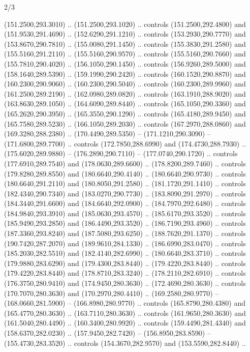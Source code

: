 \begin{flagdescription}{2/3}
\begin{scope}[xshift=0.5\flaglength,yshift=0.5\flagwidth,scale=\stretchfactor]
\begin{scope}[scale=0.001645\flagwidth,yshift=65mm,xshift=-63mm]
\begin{scope}[y=0.80pt, x=0.80pt, yscale=-1,]
\begin{scope}[cm={{1.33333,0.0,0.0,1.33333,(0.0,1e-05)}}]
  (151.2500,293.3010) .. (151.2500,293.1020) .. controls (151.2500,292.4800) and
  (151.9530,291.4690) .. (152.6290,291.1210) .. controls (153.2930,290.7770) and
  (153.8670,290.7810) .. (155.0080,291.1450) .. controls (155.3830,291.2580) and
  (155.5160,291.2110) .. (155.5160,290.9570) .. controls (155.5160,290.7660) and
  (155.7810,290.4020) .. (156.1050,290.1450) .. controls (156.9260,289.5000) and
  (158.1640,289.5390) .. (159.1990,290.2420) .. controls (160.1520,290.8870) and
  (160.2300,290.9060) .. (160.2300,290.5040) .. controls (160.2300,289.9960) and
  (161.2500,289.2190) .. (162.0980,289.0820) .. controls (163.1910,288.9020) and
  (163.8630,289.1050) .. (164.6090,289.8440) .. controls (165.1050,290.3360) and
  (165.2620,290.3950) .. (165.3550,290.1290) .. controls (165.4180,289.9450) and
  (165.7580,289.5230) .. (166.1050,289.2030) .. controls (167.2970,288.0860) and
  (169.3280,288.2380) .. (170.4490,289.5350) -- (171.1210,290.3090) --
  (171.6800,289.7700) .. controls (172.7850,288.6990) and (174.4730,288.7930) ..
  (175.6020,289.9880) -- (176.2890,290.7110) -- (177.0740,290.1720) .. controls
  (177.6910,289.7540) and (178.0630,289.6600) .. (178.8200,289.7460) .. controls
  (179.8280,289.8550) and (180.6640,290.4140) .. (180.6640,290.9730) .. controls
  (180.6640,291.2110) and (180.8050,291.2580) .. (181.1720,291.1410) .. controls
  (182.4340,290.7340) and (183.0270,290.7730) .. (183.8090,291.2970) .. controls
  (184.3440,291.6600) and (184.6640,292.0900) .. (184.7970,292.6480) .. controls
  (184.9840,293.3910) and (185.0630,293.4570) .. (185.6170,293.3520) .. controls
  (185.9490,293.2850) and (186.4490,293.3520) .. (186.7190,293.4960) .. controls
  (187.3360,293.8240) and (187.5080,293.6250) .. (188.7620,291.1370) .. controls
  (190.7420,287.2070) and (189.9610,284.1330) .. (186.6990,283.0470) .. controls
  (185.2030,282.5510) and (182.4140,282.6990) .. (180.6640,283.3710) .. controls
  (179.9880,283.6290) and (179.4300,283.8440) .. (179.4220,283.8440) .. controls
  (179.4220,283.8440) and (178.8710,283.3240) .. (178.2110,282.6910) .. controls
  (176.3750,280.9410) and (174.9450,280.3630) .. (172.4690,280.3630) .. controls
  (170.7070,280.3630) and (170.2970,280.4410) .. (169.2580,280.9770) --
  (168.0660,281.5900) -- (166.8980,280.9770) .. controls (165.8790,280.4380) and
  (165.4770,280.3630) .. (163.7110,280.3630) .. controls (161.9650,280.3630) and
  (161.5040,280.4490) .. (160.3400,280.9920) .. controls (159.4490,281.4340) and
  (158.6370,282.0230) .. (157.9450,282.7420) -- (156.8950,283.8590) --
  (155.4730,283.3520) .. controls (154.3670,282.9570) and (153.5590,282.8440) ..

\end{scope}
\end{scope}
\end{scope}
\end{scope}
\end{flagdescription}
